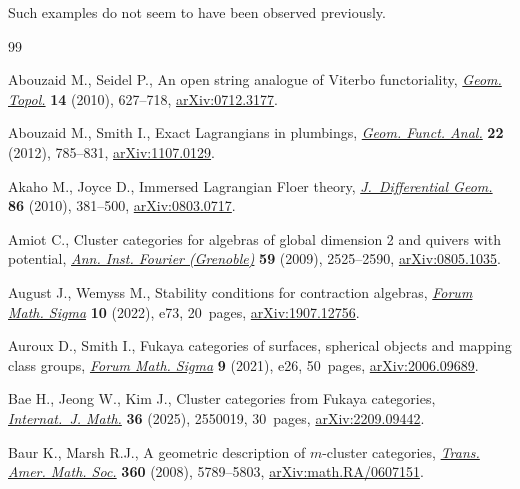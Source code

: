 \documentclass[10pt,a4paper]{amsart}
\theoremstyle{definition}
\numberwithin{equation}{section}
\begin{document}
Such examples do not seem to have been observed previously.


\begin{thebibliography}{99}
\footnotesize\itemsep=0pt

Abouzaid M., Seidel P., An open string analogue of {V}iterbo functoriality,
 \href{https://doi.org/10.2140/gt.2010.14.627}{\textit{Geom. Topol.}}
 \textbf{14} (2010), 627--718,
 \href{http://arxiv.org/abs/0712.3177}{arXiv:0712.3177}.

Abouzaid M., Smith I., Exact {L}agrangians in plumbings,
 \href{https://doi.org/10.1007/s00039-012-0162-y}{\textit{Geom. Funct. Anal.}}
 \textbf{22} (2012), 785--831,
 \href{http://arxiv.org/abs/1107.0129}{arXiv:1107.0129}.

Akaho M., Joyce D., Immersed {L}agrangian {F}loer theory,
 \href{https://doi.org/10.4310/jdg/1303219427}{\textit{J.~Differential Geom.}}
 \textbf{86} (2010), 381--500,
 \href{http://arxiv.org/abs/0803.0717}{arXiv:0803.0717}.

Amiot C., Cluster categories for algebras of global dimension 2 and quivers
 with potential, \href{https://doi.org/10.5802/aif.2499}{\textit{Ann. Inst.
 Fourier (Grenoble)}} \textbf{59} (2009), 2525--2590,
 \href{http://arxiv.org/abs/0805.1035}{arXiv:0805.1035}.

August J., Wemyss M., Stability conditions for contraction algebras,
 \href{https://doi.org/10.1017/fms.2022.65}{\textit{Forum Math. Sigma}}
 \textbf{10} (2022), e73, 20~pages,
 \href{http://arxiv.org/abs/1907.12756}{arXiv:1907.12756}.

Auroux D., Smith I., Fukaya categories of surfaces, spherical objects and
 mapping class groups,
 \href{https://doi.org/10.1017/fms.2021.21}{\textit{Forum Math. Sigma}}
 \textbf{9} (2021), e26, 50~pages,
 \href{http://arxiv.org/abs/2006.09689}{arXiv:2006.09689}.

Bae H., Jeong W., Kim J., Cluster categories from {F}ukaya categories,
 \href{https://doi.org/10.1142/S0129167X25500193}{\textit{Internat.~J. Math.}}
 \textbf{36} (2025), 2550019, 30~pages,
 \href{http://arxiv.org/abs/2209.09442}{arXiv:2209.09442}.

Baur K., Marsh R.J., A geometric description of {$m$}-cluster categories,
 \href{https://doi.org/10.1090/S0002-9947-08-04441-3}{\textit{Trans. Amer.
 Math. Soc.}} \textbf{360} (2008), 5789--5803,
 \href{http://arxiv.org/abs/math.RA/0607151}{arXiv:math.RA/0607151}.


\end{thebibliography}
\end{document}
